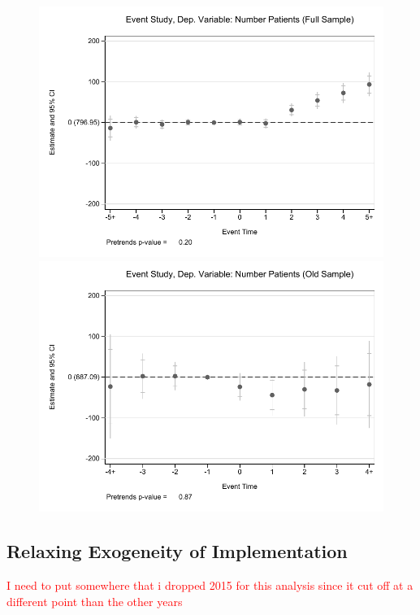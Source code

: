 \documentclass[11pt]{article}
\begin{document}
\begin{figure}[ht]
\caption{}
        \begin{minipage}[b]{0.47\linewidth}
            \centering
            \includegraphics[width=\textwidth]{Objects/prod_eventstudy_fullsample.pdf}
        \end{minipage}
        \hspace{0.2cm}
        \begin{minipage}[b]{0.47\linewidth}
            \centering
            \includegraphics[width=\textwidth]{Objects/prod_eventstudy_oldsample.pdf}
        \end{minipage}
\end{figure}

\subsection{Relaxing Exogeneity of Implementation}


\textcolor{red}{I need to put somewhere that i dropped 2015 for this analysis since it cut off at a different point than the other years}

\renewcommand*{\bibfont}{\footnotesize}

\printbibliography

\newpage

\appendix

\section{}
\end{document}
